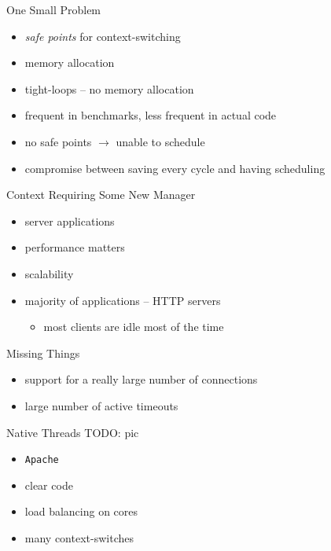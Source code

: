 \documentclass{beamer}
\begin{document}
\begin{frame}{One Small Problem}
  \begin{itemize}[<+->]
    \item \textit{safe points} for context-switching
    \item memory allocation
    \item tight-loops -- no memory allocation
    \item frequent in benchmarks, less frequent in actual code
    \item no safe points $\rightarrow$ unable to schedule
    \item compromise between saving every cycle and having scheduling
  \end{itemize}
\end{frame}

\begin{frame}{Context Requiring Some New Manager}
  \begin{itemize}
    \item server applications
    \pause
    \item performance matters
    \item scalability
    \pause
    \item majority of applications -- HTTP servers
    \begin{itemize}
      \item most clients are idle most of the time
    \end{itemize}
  \end{itemize}
\end{frame}

\begin{frame}{Missing Things}
  \begin{itemize}
    \item support for a really large number of connections
    \item large number of active timeouts
  \end{itemize}
\end{frame}

\begin{frame}{Native Threads}
  TODO: pic
  \begin{itemize}
    \item \texttt{Apache}
    \pause
    \item clear code
    \item load balancing on cores
    \pause
    \item many context-switches
  \end{itemize}
\end{frame}
\end{document}
